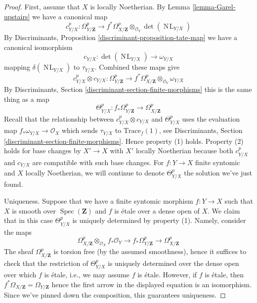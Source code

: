\documentclass{amsart}
\theoremstyle{plain}
\theoremstyle{definition}
\theoremstyle{remark}
\numberwithin{equation}{subsection}
\def\Spec{\mathop{\mathrm{Spec}}}
\def\NL{\mathop{N\!L}\nolimits}
\begin{document}
\begin{proof}
First, assume that $X$ is locally Noetherian. By
Lemma \ref{lemma-Garel-upstairs} we have a canonical map
$$
c^p_{Y/X} : \Omega_{Y/\mathbf{Z}}^p
\longrightarrow
f^*\Omega_{X/\mathbf{Z}}^p \otimes_{\mathcal{O}_Y} \det(\NL_{Y/X})
$$
By Discriminants, Proposition \ref{discriminant-proposition-tate-map}
we have a canonical isomorphism
$$
c_{Y/X} : \det(\NL_{Y/X}) \to \omega_{Y/X}
$$
mapping $\delta(\NL_{Y/X})$ to $\tau_{Y/X}$. Combined these maps give
$$
c^p_{Y/X} \otimes c_{Y/X} :
\Omega_{Y/\mathbf{Z}}^p
\longrightarrow
f^*\Omega_{X/\mathbf{Z}}^p \otimes_{\mathcal{O}_Y} \omega_{Y/X}
$$
By Discriminants, Section \ref{discriminant-section-finite-morphisms}
this is the same thing as a map
$$
\Theta_{Y/X}^p :
f_*\Omega_{Y/\mathbf{Z}}^p
\longrightarrow
\Omega_{X/\mathbf{Z}}^p
$$
Recall that the relationship between $c^p_{Y/X} \otimes c_{Y/X}$
and $\Theta_{Y/X}^p$ uses the evaluation map
$f_*\omega_{Y/X} \to \mathcal{O}_X$
which sends $\tau_{Y/X}$ to $\text{Trace}_f(1)$, see
Discriminants, Section \ref{discriminant-section-finite-morphisms}.
Hence property (1) holds. Property (2) holds for base changes by
$X' \to X$ with $X'$ locally Noetherian because both $c^p_{Y/X}$ and
$c_{Y/X}$ are compatible with such base changes. For $f : Y \to X$
finite syntomic and $X$ locally Noetherian,
we will continue to denote $\Theta^p_{Y/X}$ the solution we've just found.

\medskip\noindent
Uniqueness. Suppose that we have a finite syntomic morphism
$f: Y \to X$ such that $X$ is smooth over $\Spec(\mathbf{Z})$
and $f$ is \'etale over a dense open of $X$. We claim that
in this case $\Theta^p_{Y/X}$ is uniquely determined by property (1).
Namely, consider the maps
$$
\Omega^p_{X/\mathbf{Z}} \otimes_{\mathcal{O}_X} f_*\mathcal{O}_Y \to
f_*\Omega^p_{Y/\mathbf{Z}} \to
\Omega^p_{X/\mathbf{Z}}
$$
The sheaf $\Omega^p_{X/\mathbf{Z}}$ is torsion free (by the assumed
smoothness), hence it suffices to check that the restriction of
$\Theta^p_{Y/X}$ is uniquely determined over the dense open over
which $f$ is \'etale, i.e., we may assume $f$ is \'etale.
However, if $f$ is \'etale, then
$f^*\Omega_{X/\mathbf{Z}} = \Omega_{Y/\mathbf{Z}}$
hence the first arrow in the displayed equation is an isomorphism.
Since we've pinned down the composition, this guarantees uniqueness.


\end{proof}
\end{document}
